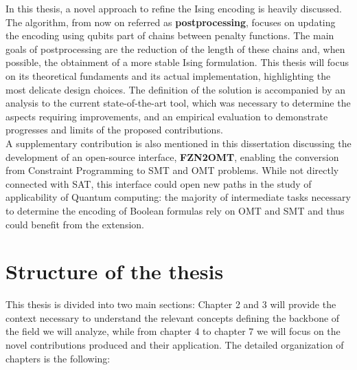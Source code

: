 In this thesis, a novel approach to refine the Ising encoding is heavily discussed. The algorithm, from now on referred as \textbf{postprocessing}, focuses on updating the encoding using qubits part of chains between penalty functions. The main goals of postprocessing are the reduction of the length of these chains and, when possible, the obtainment of a more stable Ising formulation. This thesis will focus on its theoretical fundaments and its actual implementation, highlighting the most delicate design choices.  The definition of the solution is accompanied by an analysis to the current state-of-the-art tool, which was necessary to determine the aspects requiring improvements, and an empirical evaluation to demonstrate progresses and limits of the proposed contributions. \\
A supplementary contribution is also mentioned in this dissertation discussing the development of an open-source interface, \textbf{FZN2OMT}, enabling the conversion from Constraint Programming to SMT and OMT problems. While not directly connected with SAT, this interface could open new paths in the study of applicability of Quantum computing: the majority of intermediate tasks necessary to determine the encoding of Boolean formulas rely on OMT and SMT and thus could benefit from the extension.

\newpage

\section{Structure of the thesis}

This thesis is divided into two main sections: Chapter 2 and 3 will provide the context necessary to understand the relevant concepts defining the backbone of the field we will analyze, while from chapter 4 to chapter 7 we will focus on the novel contributions produced and their application. The detailed organization of chapters is the following:

